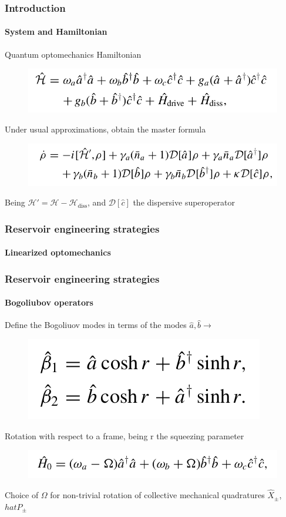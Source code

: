 \documentclass[aspectratio=43]{beamer}
\begin{document}
\begin{frame}
	
	\frametitle{Introduction}
	\framesubtitle{System and Hamiltonian}
	
	Quantum optomechanics Hamiltonian
	\begin{figure}
		\includegraphics[width = 8 cm]{plots/hamiltonian_1.png}
	\end{figure}
	
	Under usual approximations, obtain the master formula 
	\begin{figure}
		\includegraphics[width = 8 cm]{plots/master_eq_1.png}
	\end{figure}

	Being $\mathcal{H}' = \mathcal{H} - \mathcal{H}_{\textrm{diss}}$, and $\mathcal{D}[\hat{c}]$ the dispersive superoperator
	
\end{frame}

\begin{frame}

	\frametitle{Reservoir engineering strategies}
	\framesubtitle{Linearized optomechanics}
	


\end{frame}

\begin{frame}
	
	\frametitle{Reservoir engineering strategies}
	\framesubtitle{Bogoliubov operators}
	
	Define the {\color{blue}Bogoliuov} modes in terms of the modes $\hat{a}, \hat{b} \longrightarrow$
	\begin{figure}
		\includegraphics[width = 5 cm]{plots/bogoliubov_1.png}
	\end{figure}	

	Rotation with respect to a frame, being r the {\color{blue}squeezing parameter} 
	\begin{figure}
		\includegraphics[width = 8 cm]{plots/hamiltonian_2.png}
	\end{figure}	

	Choice of $\Omega$ for non-trivial rotation of collective mechanical quadratures $\hat{X}_{\pm}$, $hat{P}_{\pm}$

\end{frame}
\end{document}
